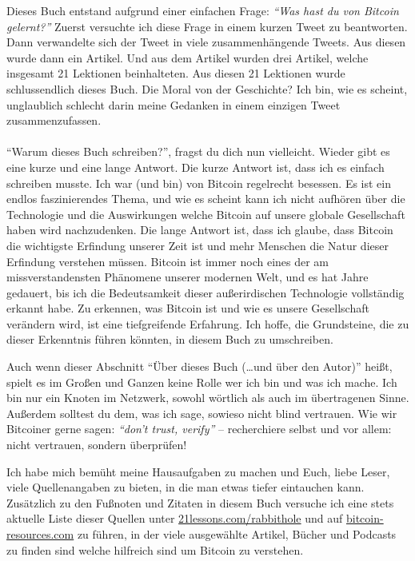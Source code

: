 Dieses Buch entstand aufgrund einer einfachen Frage: \textit{\enquote{Was hast
du von Bitcoin gelernt?}} Zuerst versuchte ich diese Frage in einem kurzen Tweet
zu beantworten. Dann verwandelte sich der Tweet in viele zusammenhängende
Tweets. Aus diesen wurde dann ein Artikel. Und aus dem Artikel wurden drei
Artikel, welche insgesamt 21 Lektionen beinhalteten. Aus diesen 21 Lektionen
wurde schlussendlich dieses Buch. Die Moral von der Geschichte? Ich bin, wie es
scheint,  unglaublich schlecht darin meine Gedanken in einem einzigen Tweet
zusammenzufassen.

\paragraph{}
\enquote{Warum dieses Buch schreiben?}, fragst du dich nun vielleicht. Wieder
gibt es eine kurze und eine lange Antwort. Die kurze Antwort ist, dass ich es
einfach schreiben musste. Ich war (und bin) von Bitcoin regelrecht besessen. Es
ist ein endlos faszinierendes Thema, und wie es scheint kann ich nicht aufhören
über die Technologie und die Auswirkungen welche Bitcoin auf unsere globale
Gesellschaft haben wird nachzudenken. Die lange Antwort ist, dass ich glaube,
dass Bitcoin die wichtigste Erfindung unserer Zeit ist und mehr Menschen die
Natur dieser Erfindung verstehen müssen. Bitcoin ist immer noch eines der am
missverstandensten Phänomene unserer modernen Welt, und es hat Jahre
gedauert, bis ich die Bedeutsamkeit dieser außerirdischen Technologie vollständig
erkannt habe. Zu erkennen, was Bitcoin ist und wie es unsere Gesellschaft
verändern wird, ist eine tiefgreifende Erfahrung. Ich hoffe, die Grundsteine, die zu
dieser Erkenntnis führen könnten, in diesem Buch zu umschreiben.

Auch wenn dieser Abschnitt \enquote{Über dieses Buch (\ldots und über den
Autor)} heißt, spielt es im Großen und Ganzen keine Rolle wer ich bin und was
ich mache. Ich bin nur ein Knoten im Netzwerk, sowohl wörtlich als auch im
übertragenen Sinne. Außerdem solltest du dem, was ich sage, sowieso nicht blind
vertrauen. Wie wir Bitcoiner gerne sagen: \textit{\enquote{don't trust, verify}}
-- recherchiere selbst und vor allem: nicht vertrauen, sondern überprüfen!

Ich habe mich bemüht meine Hausaufgaben zu machen und Euch, liebe Leser, viele
Quellenangaben zu bieten, in die man etwas tiefer eintauchen kann. Zusätzlich zu
den Fußnoten und Zitaten in diesem Buch versuche ich eine stets aktuelle Liste
dieser Quellen unter
\href{https://21lessons.com/rabbithole}{21lessons.com/rabbithole} und auf
\href{https://bitcoin-resources.com}{bitcoin-resources.com} zu führen, in der
viele ausgewählte Artikel, Bücher und Podcasts zu finden sind welche hilfreich
sind um Bitcoin zu verstehen.

